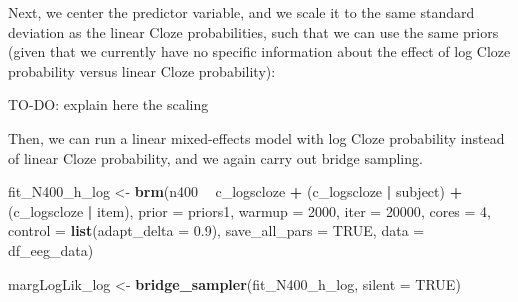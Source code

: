 \documentclass[12pt,]{krantz}
\newenvironment{Shaded}{\begin{snugshade}}{\end{snugshade}}
\newcommand{\DataTypeTok}[1]{\textcolor[rgb]{0.13,0.29,0.53}{#1}}
\newcommand{\DecValTok}[1]{\textcolor[rgb]{0.00,0.00,0.81}{#1}}
\newcommand{\FloatTok}[1]{\textcolor[rgb]{0.00,0.00,0.81}{#1}}
\newcommand{\KeywordTok}[1]{\textcolor[rgb]{0.13,0.29,0.53}{\textbf{#1}}}
\newcommand{\NormalTok}[1]{#1}
\newcommand{\OperatorTok}[1]{\textcolor[rgb]{0.81,0.36,0.00}{\textbf{#1}}}
\newcommand{\OtherTok}[1]{\textcolor[rgb]{0.56,0.35,0.01}{#1}}
\newcommand{\StringTok}[1]{\textcolor[rgb]{0.31,0.60,0.02}{#1}}
\theoremstyle{definition}
\theoremstyle{definition}
\theoremstyle{definition}
\theoremstyle{remark}
\begin{document}
Next, we center the predictor variable, and we scale it to the same standard deviation as the linear Cloze probabilities, such that we can use the same priors (given that we currently have no specific information about the effect of log Cloze probability versus linear Cloze probability):

TO-DO: explain here the scaling

\begin{Shaded}
\end{Shaded}

Then, we can run a linear mixed-effects model with log Cloze probability instead of linear Cloze probability, and we again carry out bridge sampling.

\begin{Shaded}
\begin{Highlighting}[]
\NormalTok{fit_N400_h_log <-}\StringTok{ }\KeywordTok{brm}\NormalTok{(n400 }\OperatorTok{~}\StringTok{ }\NormalTok{c_logscloze }\OperatorTok{+}\StringTok{ }
\StringTok{                        }\NormalTok{(c_logscloze }\OperatorTok{|}\StringTok{ }\NormalTok{subject) }\OperatorTok{+}\StringTok{ }\NormalTok{(c_logscloze }\OperatorTok{|}\StringTok{ }\NormalTok{item), }
                      \DataTypeTok{prior   =}\NormalTok{ priors1,}
                      \DataTypeTok{warmup  =} \DecValTok{2000}\NormalTok{,}
                      \DataTypeTok{iter    =} \DecValTok{20000}\NormalTok{,}
                      \DataTypeTok{cores   =} \DecValTok{4}\NormalTok{,}
                      \DataTypeTok{control =} \KeywordTok{list}\NormalTok{(}\DataTypeTok{adapt_delta =} \FloatTok{0.9}\NormalTok{),}
                      \DataTypeTok{save_all_pars =} \OtherTok{TRUE}\NormalTok{,}
                      \DataTypeTok{data    =}\NormalTok{ df_eeg_data)}
\end{Highlighting}
\end{Shaded}

\begin{Shaded}
\begin{Highlighting}[]
\NormalTok{margLogLik_log <-}\StringTok{ }\KeywordTok{bridge_sampler}\NormalTok{(fit_N400_h_log, }\DataTypeTok{silent =} \OtherTok{TRUE}\NormalTok{)}
\end{Highlighting}
\end{Shaded}
\end{document}
